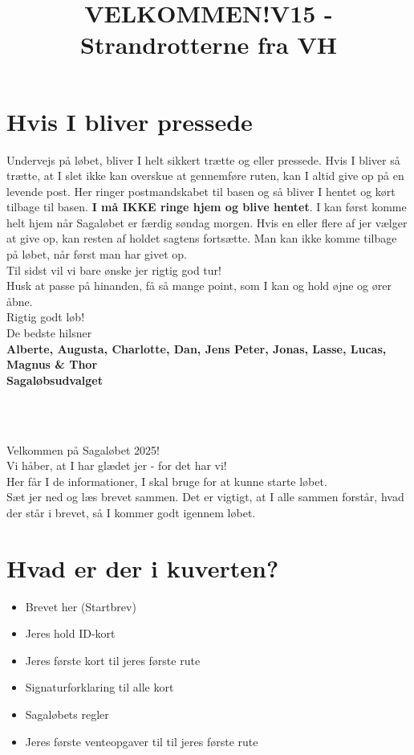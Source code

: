 \section{Hvis I bliver pressede}
Undervejs på løbet, bliver I helt sikkert trætte og eller pressede. Hvis I bliver så trætte, at I slet ikke kan overskue at gennemføre ruten, kan I altid give op på en levende post. Her ringer postmandskabet til basen og så bliver I hentet og kørt tilbage til basen. \textbf{I må IKKE ringe hjem og blive hentet}. I kan først komme helt hjem når Sagaløbet er færdig søndag morgen. Hvis en eller flere af jer vælger at give op, kan resten af holdet sagtens fortsætte. Man kan ikke komme tilbage på løbet, når først man har givet op.\\
\newline
Til sidst vil vi bare ønske jer rigtig god tur!\\
Husk at passe på hinanden, få så mange point, som I kan og hold øjne og ører åbne.\\
\newline
Rigtig godt løb!\\
\newline
\textcolor{søblå}{De bedste hilsner}\\
\textcolor{natblå}{\textbf{Alberte, Augusta, Charlotte, Dan, Jens Peter, Jonas, Lasse, Lucas, Magnus \& Thor}}\\
\textcolor{natblå}{\textbf{Sagaløbsudvalget}}\\
\newpage
\title{VELKOMMEN!}\\
\newline
\title{\textcolor{søblå}{V15 - Strandrotterne fra VH }}\\
\newline
Velkommen på Sagaløbet 2025!\\
Vi håber, at I har glædet jer - for det har vi!\\
Her får I de informationer, I skal bruge for at kunne starte løbet.\\
Sæt jer ned og læs brevet sammen. Det er vigtigt, at I alle sammen forstår, hvad der står i brevet, så I kommer godt igennem løbet.
\section{Hvad er der i kuverten?}
\begin{itemize}
    \item Brevet her (Startbrev)
    \item Jeres hold ID-kort
    \item Jeres første kort til jeres første rute
    \item Signaturforklaring til alle kort
    \item Sagaløbets regler
    \item Jeres første venteopgaver til til jeres første rute
\end{itemize}
